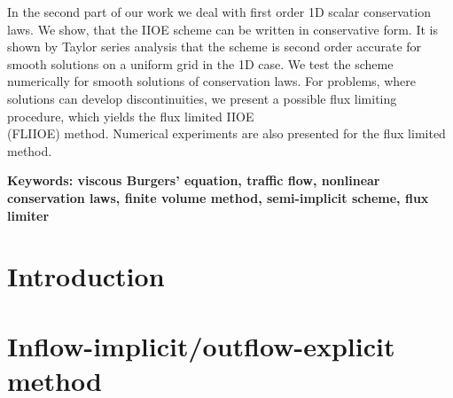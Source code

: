 \documentclass[a4paper,12pt]{report}%
\begin{document}
In the second part of our work we deal with first order 1D scalar conservation laws. We show, that the IIOE scheme can be written in conservative form. It is shown by Taylor series analysis that the scheme is second order accurate for smooth solutions on a uniform grid in the 1D case. We test the scheme numerically for smooth solutions of conservation laws. For problems, where solutions can develop discontinuities, we present a possible flux limiting procedure, which yields the flux limited IIOE \\(FLIIOE) method. Numerical experiments are also presented for the flux limited method.
\newline\newline

\textbf{Keywords: viscous Burgers' equation,  traffic flow, nonlinear conservation laws, finite volume method, semi-implicit scheme, flux limiter}
\newpage
{\pagestyle{headings}
	\tableofcontents
	\cleardoublepage}

\chapter{Introduction}\label{introduction}%

\chapter{Inflow-implicit/outflow-explicit method}

%
%

\end{document}
